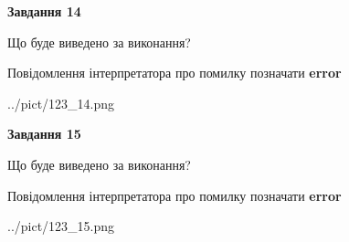\documentclass[11pt, ukrainian]{article}
\begin{document}
{\begin {large}
{\begin {center}\textbf{Завдання 14}\end {center}}\par
Що буде виведено за виконання? \par
Повідомлення інтерпретатора про помилку позначати \textbf{error}

\begin{center}
	{../pict/123_14.png}
\end{center}
\newpage

{\begin {center}\textbf{Завдання 15}\end {center}}\par
Що буде виведено за виконання? \par
Повідомлення інтерпретатора про помилку позначати \textbf{error}

\begin{center}
	{../pict/123_15.png}
\end{center}
\newpage

\end {large}}
\end{document}
